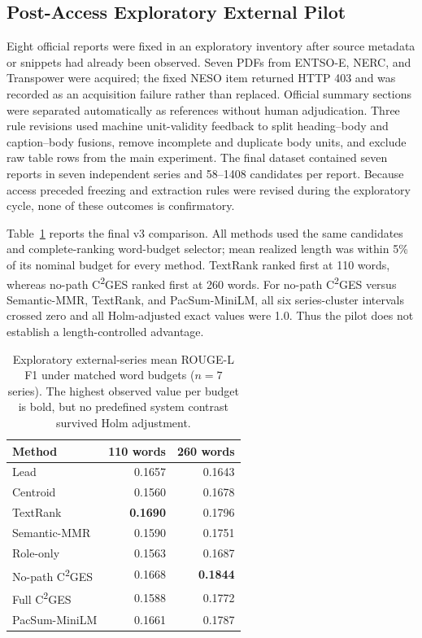 \documentclass[information,article,submit,moreauthors]{Definitions/mdpi}
\newcommand{\cges}{C\textsuperscript{2}GES}
\begin{document}
\subsection{Post-Access Exploratory External Pilot}

Eight official reports were fixed in an exploratory inventory after source metadata or snippets had already been observed. Seven PDFs from ENTSO-E, NERC, and Transpower were acquired; the fixed NESO item returned HTTP 403 and was recorded as an acquisition failure rather than replaced. Official summary sections were separated automatically as references without human adjudication. Three rule revisions used machine unit-validity feedback to split heading--body and caption--body fusions, remove incomplete and duplicate body units, and exclude raw table rows from the main experiment. The final dataset contained seven reports in seven independent series and 58--1408 candidates per report. Because access preceded freezing and extraction rules were revised during the exploratory cycle, none of these outcomes is confirmatory.

Table~\ref{tab:external-exploratory} reports the final v3 comparison. All methods used the same candidates and complete-ranking word-budget selector; mean realized length was within 5\% of its nominal budget for every method. TextRank ranked first at 110 words, whereas no-path \cges{} ranked first at 260 words. For no-path \cges{} versus Semantic-MMR, TextRank, and PacSum-MiniLM, all six series-cluster intervals crossed zero and all Holm-adjusted exact values were 1.0. Thus the pilot does not establish a length-controlled advantage.

\begin{table}[H]
\caption{Exploratory external-series mean ROUGE-L F1 under matched word budgets ($n=7$ series). The highest observed value per budget is bold, but no predefined system contrast survived Holm adjustment.}
\label{tab:external-exploratory}\centering\small
\begin{tabular}{lrr}
\toprule
Method & 110 words & 260 words\\
\midrule
Lead & 0.1657 & 0.1643\\
Centroid & 0.1560 & 0.1678\\
TextRank & \textbf{0.1690} & 0.1796\\
Semantic-MMR & 0.1590 & 0.1751\\
Role-only & 0.1563 & 0.1687\\
No-path \cges{} & 0.1668 & \textbf{0.1844}\\
Full \cges{} & 0.1588 & 0.1772\\
PacSum-MiniLM & 0.1661 & 0.1787\\
\bottomrule
\end{tabular}
\end{table}
\end{document}
